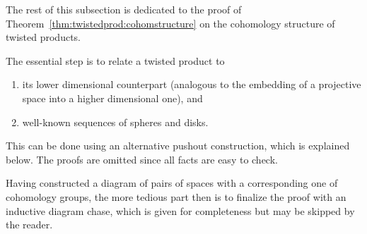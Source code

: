 The rest of this subsection is dedicated to the proof of
Theorem~\ref{thm:twistedprod:cohomstructure} on the cohomology
structure of twisted products.

The essential step is to relate a twisted product to
\begin{enumerate}[1.]
\item its lower dimensional counterpart (analogous to the embedding of
  a projective space into a higher dimensional one), and
\item well-known sequences of spheres and disks.
\end{enumerate}
This can be done using an alternative pushout construction, which is
explained below. The proofs are omitted since all facts are easy to
check.

Having constructed a diagram of pairs of spaces with a corresponding
one of cohomology groups, the more tedious part then is to finalize
the proof with an inductive diagram chase, which is given for
completeness but may be skipped by the reader.

